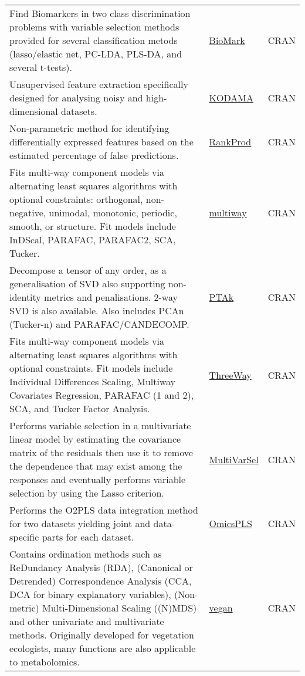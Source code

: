 \documentclass[]{article}
\begin{document}
\begin{longtable}{>{\raggedright\arraybackslash}p{30em}>{\raggedright\arraybackslash}p{10em}>{\raggedright\arraybackslash}p{3em}}
\rowcolor{gray!6}  Find Biomarkers in two class discrimination problems with variable selection methods provided for several classification metods (lasso/elastic net, PC-LDA, PLS-DA, and several t-tests). & \href{https://cran.r-project.org/web/packages/BioMark/index.html}{BioMark} & CRAN\\
Unsupervised feature extraction specifically designed for analysing noisy and high-dimensional datasets. & \href{https://cran.r-project.org/package=KODAMA}{KODAMA} & CRAN\\
\rowcolor{gray!6}  Non-parametric method for identifying differentially expressed features based on the estimated percentage of false predictions. & \href{https://doi.org/doi:10.18129/B9.bioc.RankProd}{RankProd} & CRAN\\
Fits multi-way component models via alternating least squares algorithms with optional constraints: orthogonal, non-negative, unimodal, monotonic, periodic, smooth, or structure. Fit models include InDScal, PARAFAC, PARAFAC2, SCA, Tucker. & \href{https://cran.r-project.org/package=multiway}{multiway} & CRAN\\
\rowcolor{gray!6}  Decompose a tensor of any order, as a generalisation of SVD also supporting non-identity metrics and penalisations. 2-way SVD is also available. Also includes PCAn (Tucker-n) and PARAFAC/CANDECOMP. & \href{https://cran.r-project.org/package=PTAk}{PTAk} & CRAN\\
Fits multi-way component models via alternating least squares algorithms with optional constraints. Fit models include Individual Differences Scaling, Multiway Covariates Regression, PARAFAC (1 and 2), SCA, and Tucker Factor Analysis. & \href{https://cran.r-project.org/package=ThreeWay}{ThreeWay} & CRAN\\
\rowcolor{gray!6}  Performs variable selection in a multivariate linear model by estimating the covariance matrix of the residuals then use it to remove the dependence that may exist among the responses and eventually performs variable selection by using the Lasso criterion. & \href{https://cran.r-project.org/package=MultiVarSel}{MultiVarSel} & CRAN\\
Performs the O2PLS data integration method for two datasets yielding joint and data-specific parts for each dataset. & \href{https://cran.r-project.org/package=OmicsPLS}{OmicsPLS} & CRAN\\
\rowcolor{gray!6}  Contains ordination methods such as ReDundancy Analysis (RDA), (Canonical or Detrended) Correspondence Analysis (CCA, DCA for binary explanatory variables), (Non-metric) Multi-Dimensional Scaling ((N)MDS) and other univariate and multivariate methods. Originally developed for vegetation ecologists, many functions are also applicable to metabolomics. & \href{https://cran.r-project.org/package=vegan}{vegan} & CRAN\\

\end{longtable}
\end{document}
